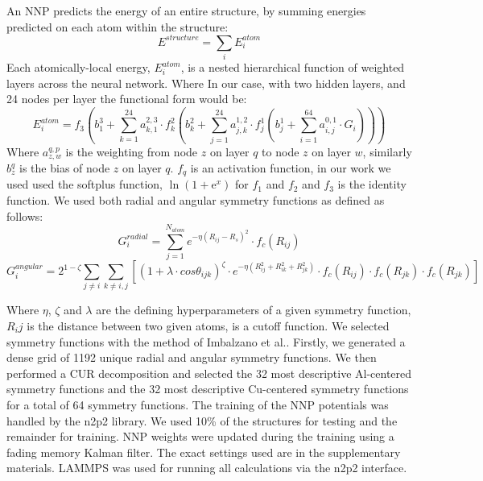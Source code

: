 \documentclass{article}
\begin{document}
An NNP predicts the energy of an entire structure, by summing energies predicted on each atom within the structure: 
\begin{equation}
E^{structure} = \sum_i E^{atom}_i
\end{equation}
Each atomically-local energy, $E^{atom}_i$, is a nested hierarchical function of weighted layers across the neural network.
Where In our case, with two hidden layers, and 24 nodes per layer the functional form would be:
\begin{equation}
E^{atom}_i = f_3 ( b^3_1+\sum^{24}_{k=1}a^{2,3}_{k,1}\cdot f^2_k(b^2_k+\sum^{24}_{j=1}a^{1,2}_{j,k}\cdot f^1_j ( b^1_j + \sum^{64}_{i=1} a^{0,1}_{i,j}\cdot G_i  ))) 
\end{equation}
Where $a^{q,p}_{z,w}$ is the weighting from node $z$ on layer $q$ to node $z$ on layer $w$, similarly $b^q_z$ is
the bias of node $z$ on layer $q$. $f_q$ is an activation function, in our work we used used the softplus function,
$\ln (1 + \mathrm{e}^x)$ for $f_1$ and $f_2$ and $f_3$ is the identity function. 
We used both radial and angular symmetry functions as  defined as follows:
\begin{equation}
G^{radial}_i = \sum^{N_{atom}}_{j=1}e^{-\eta(R_{ij}-R_{s})^2}\cdot f_c(R_{ij})
\end{equation}
\begin{equation}
G^{angular}_i = 2^{1-\zeta}\sum_{j\neq i}\sum_{k\neq i,j}[ (1+\lambda\cdot cos\theta_{ijk})^\zeta \cdot e^{-\eta(R^2_{ij}+R^2_{ik}+R^2_{jk})}\cdot f_c(R_{ij}) \cdot f_c(R_{jk}) \cdot f_c(R_{jk}) ]
\end{equation}

Where $\eta$, $\zeta$ and $\lambda$ are the defining hyperparameters of a given symmetry function, $R_ij$ is 
the distance between two given atoms, is a cutoff function. 
We selected symmetry functions with the method of Imbalzano et al.\cite{Imbalzano2018}.
Firstly, we generated a dense grid of 1192 unique radial and angular symmetry functions.
We then performed a CUR decomposition and selected the 32 most descriptive Al-centered symmetry functions and the 32 most descriptive Cu-centered symmetry functions for a total of 64 symmetry functions.
The training of the NNP potentials was handled by the n2p2 library\cite{Singraber2019ParallelPotentials}\cite{Singraber2019Library-BasedPotentials}.
We used 10\% of the structures for testing and the remainder for training.
NNP weights were updated during the training using a fading memory Kalman filter.
The exact settings used are in the supplementary materials.
LAMMPS\cite{Plimpton1995} was used for running all calculations via the n2p2 interface. 
\end{document}
